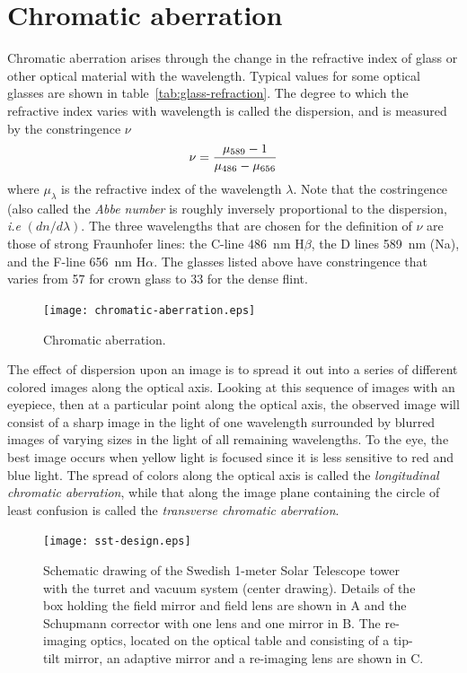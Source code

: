 \section{Chromatic aberration}

Chromatic aberration arises through the change in the refractive index of
glass or other optical material with the wavelength. Typical values for
some optical glasses are shown in table~\ref{tab:glass-refraction}. The 
degree to which the refractive index varies with wavelength is called the 
dispersion, and is measured by the constringence $\nu$
\begin{equation}
\nu={\mu_{589}-1\over\mu_{486}-\mu_{656}}\label{eq:costringence}
\end{equation}
where $\mu_\lambda$ is the refractive index of the wavelength $\lambda$. Note
that the costringence (also called the {\it Abbe number} is roughly inversely 
proportional to the dispersion, {\it i.e} $({dn/d\lambda})$.  The
three wavelengths that are chosen for the definition of $\nu$ are those
of strong Fraunhofer lines: the C-line 486~nm H$\beta$, the D lines 589~nm (Na), 
and the F-line 656~nm H$\alpha$. The glasses listed above have constringence that 
varies from 57 for crown glass to 33 for the dense flint. 

\begin{figure}[th!]
 \centering
 \texttt{[image: chromatic-aberration.eps]}
  \caption{Chromatic aberration.}
  \label{fig:chromatic-aberration}
\end{figure}

The effect of dispersion upon an image is to spread it out into a series of
different colored images along the optical axis. Looking at this sequence of
 images with an eyepiece, then at a particular point along the optical axis, the
observed image will consist of a sharp image in the light of one wavelength
surrounded by blurred images of varying sizes in the light of all remaining 
wavelengths. To the eye, the best image occurs when yellow light is focused 
since it is less sensitive to red and blue light.
The spread of colors along the optical axis is called the
{\it longitudinal chromatic aberration}, while that along the image plane
containing the circle of least confusion is called the {\it transverse
chromatic aberration}.

\begin{figure}[th!]
	\centering
	\texttt{[image: sst-design.eps]}
  \caption{Schematic drawing of the Swedish 1-meter Solar Telescope tower 
with the turret and vacuum system (center drawing). Details of the box 
holding the field mirror and field lens are shown in A and the Schupmann 
corrector with one lens and one mirror in B. The re-imaging optics, located on
the optical table and consisting of a tip-tilt mirror, an adaptive mirror 
and a re-imaging lens are shown in C.}
  \label{fig:sst-design}
\end{figure}

